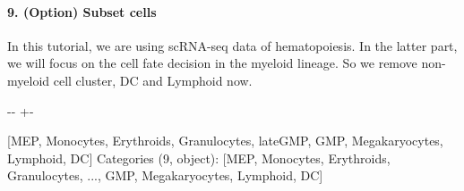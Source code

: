 \documentclass[letterpaper,10pt,english]{sphinxmanual}
\newlength\nbsphinxcodecellspacing
\begin{document}
\paragraph{9. (Option) Subset cells}
\label{\detokenize{notebooks/03_scRNA-seq_data_preprocessing/scanpy_preprocessing_with_Paul_etal_2015_data:9.-(Option)-Subset-cells}}
In this tutorial, we are using scRNA-seq data of hematopoiesis. In the latter part, we will focus on the cell fate decision in the myeloid lineage. So we remove non-myeloid cell cluster, DC and Lymphoid now.

{
%
\begin{sphinxVerbatim}[commandchars=\\\{\}]
\llap{\color{nbsphinxin}[29]:\,\hspace{\fboxrule}\hspace{\fboxsep}}
\end{sphinxVerbatim}
}

{

\kern-\sphinxverbatimsmallskipamount\kern-\baselineskip
\kern+\FrameHeightAdjust\kern-\fboxrule
\vspace{\nbsphinxcodecellspacing}

%
\begin{sphinxVerbatim}[commandchars=\\\{\}]
\llap{\color{nbsphinxout}[29]:\,\hspace{\fboxrule}\hspace{\fboxsep}}[MEP, Monocytes, Erythroids, Granulocytes, late\PYGZus{}GMP, GMP, Megakaryocytes, Lymphoid, DC]
Categories (9, object): [MEP, Monocytes, Erythroids, Granulocytes, ..., GMP, Megakaryocytes, Lymphoid, DC]
\end{sphinxVerbatim}
}

{
%
\begin{sphinxVerbatim}[commandchars=\\\{\}]
\llap{\color{nbsphinxin}[30]:\,\hspace{\fboxrule}\hspace{\fboxsep}}  \PYG{p}{[}\PYG{p}{[} \PYG{p}{]}\PYG{p}{]}
  \PYG{p}{[} \PYG{p}{]}
\end{sphinxVerbatim}
}
\end{document}
